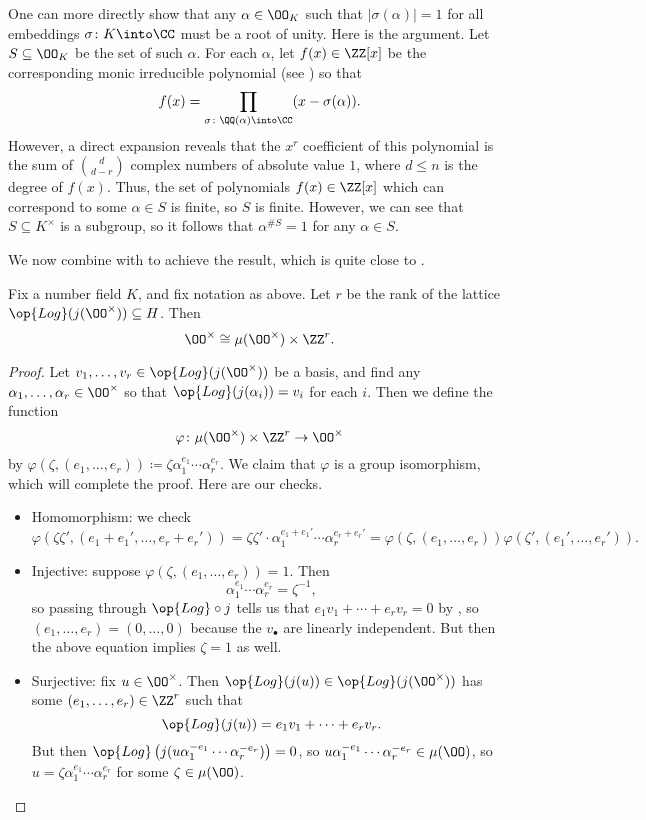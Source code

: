 \documentclass[../notes.tex]{subfiles}
\begin{document}
\begin{remark}
	One can more directly show that any $\alpha\in\OO_K$ such that $\left|\sigma(\alpha)\right|=1$ for all embeddings $\sigma\colon K\into\CC$ must be a root of unity. Here is the argument. Let $S\subseteq\OO_K$ be the set of such $\alpha$. For each $\alpha$, let $f(x)\in\ZZ[x]$ be the corresponding monic irreducible polynomial (see ) so that
	\[f(x)=\prod_{\sigma\colon\QQ(\alpha)\into\CC}(x-\sigma(\alpha)).\]
	However, a direct expansion reveals that the $x^r$ coefficient of this polynomial is the sum of $\binom d{d-r}$ complex numbers of absolute value $1$, where $d\le n$ is the degree of $f(x)$. Thus, the set of polynomials $f(x)\in\ZZ[x]$ which can correspond to some $\alpha\in S$ is finite, so $S$ is finite. However, we can see that $S\subseteq K^\times$ is a subgroup, so it follows that $\alpha^{\#S}=1$ for any $\alpha\in S$.
\end{remark}
We now combine  with  to achieve the result, which is quite close to .
\begin{proposition} \label{prop:almost-dirichlet-unit}
	Fix a number field $K$, and fix notation as above. Let $r$ be the rank of the lattice $\op{Log}(j(\OO^\times))\subseteq H$. Then
	\[\OO^\times\cong\mu(\OO^\times)\times\ZZ^r.\]
\end{proposition}
\begin{proof}
	Let $v_1,\ldots,v_r\in\op{Log}(j(\OO^\times))$ be a basis, and find any $\alpha_1,\ldots,\alpha_r\in\OO^\times$ so that $\op{Log}(j(\alpha_i))=v_i$ for each $i$. Then we define the function
	\[\varphi\colon\mu(\OO^\times)\times\ZZ^r\to\OO^\times\]
	by $\varphi(\zeta,(e_1,\ldots,e_r))\coloneqq\zeta\alpha_1^{e_1}\cdots\alpha_r^{e_r}$. We claim that $\varphi$ is a group isomorphism, which will complete the proof. Here are our checks.
	\begin{itemize}
		\item Homomorphism: we check
		\[\varphi\left(\zeta\zeta',(e_1+e_1',\ldots,e_r+e_r')\right)=\zeta\zeta'\cdot\alpha_1^{e_1+e_1'}\cdots\alpha_r^{e_r+e_r'}=\varphi\left(\zeta,(e_1,\ldots,e_r)\right)\varphi\left(\zeta',(e_1',\ldots,e_r')\right).\]
		\item Injective: suppose $\varphi(\zeta,(e_1,\ldots,e_r))=1$. Then
		\[\alpha_1^{e_1}\cdots\alpha_r^{e_r}=\zeta^{-1},\]
		so passing through ${\op{Log}}\circ j$ tells us that $e_1v_1+\cdots+e_rv_r=0$ by , so $(e_1,\ldots,e_r)=(0,\ldots,0)$ because the $v_\bullet$ are linearly independent. But then the above equation implies $\zeta=1$ as well.
		\item Surjective: fix $u\in\OO^\times$. Then $\op{Log}(j(u))\in\op{Log}(j(\OO^\times))$ has some $(e_1,\ldots,e_r)\in\ZZ^r$ such that
		\[\op{Log}(j(u))=e_1v_1+\cdots+e_rv_r.\]
		But then $\op{Log}\left(j(u\alpha_1^{-e_1}\cdots\alpha_r^{-e_r})\right)=0$, so $u\alpha_1^{-e_1}\cdots\alpha_r^{-e_r}\in\mu(\OO)$, so $u=\zeta\alpha_1^{e_1}\cdots\alpha_r^{e_r}$ for some $\zeta\in\mu(\OO)$.
		\qedhere
	\end{itemize}
\end{proof}
\end{document}
